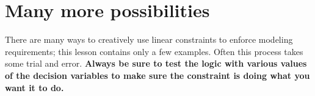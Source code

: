 \documentclass[11pt]{article}
\theoremstyle{definition}
\begin{document}
\section{Many more possibilities}

There are many ways to creatively use linear constraints to enforce modeling requirements; this lesson contains only a few examples.  Often this process takes some trial and error.  \textbf{Always be sure to test the logic with various values of the decision variables to make sure the constraint is doing what you want it to do.}
\end{document}
